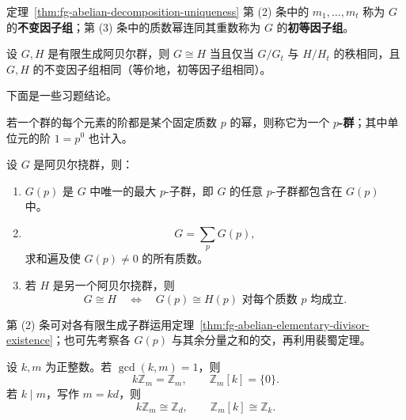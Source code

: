\begin{purplenote}
定理~\ref{thm:fg-abelian-decomposition-uniqueness} 第 (2) 条中的 $m_1,\ldots,m_t$ 称为 $G$ 的\textbf{不变因子组}；第 (3) 条中的质数幂连同其重数称为 $G$ 的\textbf{初等因子组}。
\end{purplenote}

\begin{corollary}\label{cor:fg-abelian-isomorphism-invariants}
设 $G,H$ 是有限生成阿贝尔群，则 $G\cong H$ 当且仅当 $G/G_t$ 与 $H/H_t$ 的秩相同，且 $G,H$ 的不变因子组相同（等价地，初等因子组相同）。
\end{corollary}

\begin{purplenote}
下面是一些习题结论。
\end{purplenote}

\begin{proposition}[$p$-群]\label{prop:torsion-abelian-primary-decomposition}
若一个群的每个元素的阶都是某个固定质数 $p$ 的幂，则称它为一个 \textbf{$p$-群}；其中单位元的阶 $1=p^0$ 也计入。

设 $G$ 是阿贝尔挠群，则：
\begin{enumerate}[label=(\arabic*)]
  \item $G(p)$ 是 $G$ 中唯一的最大 $p$-子群，即 $G$ 的任意 $p$-子群都包含在 $G(p)$ 中。
  \item
  \[
    G=\sum_{p}G(p),
  \]
  求和遍及使 $G(p)\ne0$ 的所有质数。
  \item 若 $H$ 是另一个阿贝尔挠群，则
  \[
    G\cong H
    \quad\Longleftrightarrow\quad
    G(p)\cong H(p)\text{ 对每个质数 }p\text{ 均成立}.
  \]
\end{enumerate}
\end{proposition}

\begin{purplenote}
第 (2) 条可对各有限生成子群运用定理~\ref{thm:fg-abelian-elementary-divisor-existence}；也可先考察各 $G(p)$ 与其余分量之和的交，再利用裴蜀定理。
\end{purplenote}

\begin{proposition}\label{prop:cyclic-multiples-and-torsion}
设 $k,m$ 为正整数。若 $\gcd(k,m)=1$，则
\[
  k\mathbb Z_m=\mathbb Z_m,\qquad
  \mathbb Z_m[k]=\{0\}.
\]
若 $k\mid m$，写作 $m=kd$，则
\[
  k\mathbb Z_m\cong\mathbb Z_d,\qquad
  \mathbb Z_m[k]\cong\mathbb Z_k.
\]
\end{proposition}

